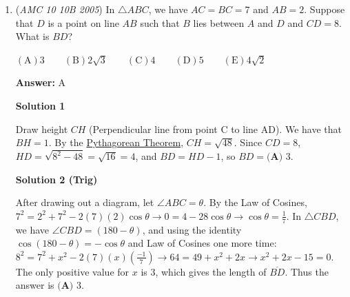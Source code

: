 \begin{enumerate}
 \textbf{Case 1}: The first die is odd and the second die is even.

 The probability of this happening is $\dfrac{4}{6}\times\dfrac{4}{6}=\dfrac{16}{36}=\dfrac{4}{9}$

 \textbf{Case 2}: The first die is even and the second die is odd.

 The probability of this happening is $\dfrac{2}{6}\times\dfrac{2}{6}=\dfrac{4}{36}=\dfrac{1}{9}$

 Adding these two probabilities will give us our final answer. $\dfrac{4}{9}+\dfrac{1}{9}=\boxed{\textbf{(D) }\dfrac{5}{9}}$

 If you run out of time, you can see it is obviously greater than $\frac{1}{2}$ so it narrows guesses.

 



\textbf{Solution 2 (Complementary Counting)}

We see can see that there are $2$ ways to get an even number, and other ways get us an odd. Therefore, if we subtract the $P(\text{even})$, we will get $P(\text{odd})$. We can get an even either by getting $2$ evens or $2$ odds. Both cases give $\frac{2}{9}$, so $P(\text{odd})$ is $1-2 \cdot \frac{2}{9}=\boxed{\textbf{(D) }\frac{5}{9}}$



	\item (\textit{AMC 10 10B 2005}) In $\triangle ABC$, we have $AC = BC = 7$ and $AB = 2$. Suppose that $D$ is a point on line $AB$ such that $B$ lies between $A$ and $D$ and $CD = 8$. What is $BD$?


 $\mathrm{(A)} 3 \qquad \mathrm{(B)} 2\sqrt{3} \qquad \mathrm{(C)} 4 \qquad \mathrm{(D)} 5 \qquad \mathrm{(E)} 4\sqrt{2}$

 \textbf{Answer: }A



\textbf{Solution 1}

Draw height $CH$ (Perpendicular line from point C to line AD). We have that $BH=1$. By the \href{https://artofproblemsolving.com/wiki/index.php?title=Pythagorean\_Theorem}{Pythagorean Theorem}, $CH=\sqrt{48}$. Since $CD=8$, $HD=\sqrt{8^2-48}=\sqrt{16}=4$, and $BD=HD-1$, so $BD=\boxed{\textbf{(A) }3}$.

 



\textbf{Solution 2 (Trig)}

After drawing out a diagram, let $\angle{ABC}=\theta$. By the Law of Cosines, $7^2=2^2+7^2-2(7)(2)\cos{\theta} \rightarrow 0=4-28\cos{\theta} \rightarrow \cos{\theta}=\frac{1}{7}$. In $\triangle CBD$, we have $\angle{CBD}=(180-\theta)$, and using the identity $\cos(180-\theta)=-\cos{\theta}$ and Law of Cosines one more time: $8^2=7^2+x^2-2(7)(x)\left( \frac{-1}{7} \right) \rightarrow 64=49+x^2+2x \rightarrow x^2+2x-15=0$. The only positive value for $x$ is $3$, which gives the length of $\overline{BD}$. Thus the answer is $\boxed{\textbf{(A) }3}$.


\end{enumerate}
